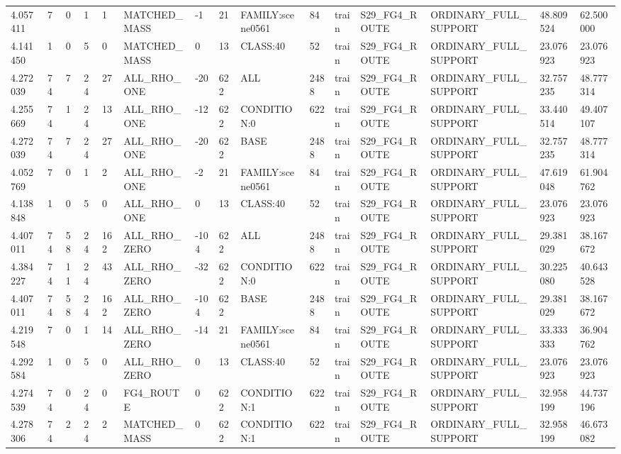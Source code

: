 \begin{tabular}{lllllllllllllll}
4.057411 & 7 & 0 & 1 & 1 & MATCHED\_MASS & -1 & 21 & FAMILY:scene0561 & 84 & train & S29\_FG4\_ROUTE & ORDINARY\_FULL\_SUPPORT & 48.809524 & 62.500000 \\
4.141450 & 1 & 0 & 5 & 0 & MATCHED\_MASS & 0 & 13 & CLASS:40 & 52 & train & S29\_FG4\_ROUTE & ORDINARY\_FULL\_SUPPORT & 23.076923 & 23.076923 \\
4.272039 & 74 & 7 & 24 & 27 & ALL\_RHO\_ONE & -20 & 622 & ALL & 2488 & train & S29\_FG4\_ROUTE & ORDINARY\_FULL\_SUPPORT & 32.757235 & 48.777314 \\
4.255669 & 74 & 1 & 24 & 13 & ALL\_RHO\_ONE & -12 & 622 & CONDITION:0 & 622 & train & S29\_FG4\_ROUTE & ORDINARY\_FULL\_SUPPORT & 33.440514 & 49.407107 \\
4.272039 & 74 & 7 & 24 & 27 & ALL\_RHO\_ONE & -20 & 622 & BASE & 2488 & train & S29\_FG4\_ROUTE & ORDINARY\_FULL\_SUPPORT & 32.757235 & 48.777314 \\
4.052769 & 7 & 0 & 1 & 2 & ALL\_RHO\_ONE & -2 & 21 & FAMILY:scene0561 & 84 & train & S29\_FG4\_ROUTE & ORDINARY\_FULL\_SUPPORT & 47.619048 & 61.904762 \\
4.138848 & 1 & 0 & 5 & 0 & ALL\_RHO\_ONE & 0 & 13 & CLASS:40 & 52 & train & S29\_FG4\_ROUTE & ORDINARY\_FULL\_SUPPORT & 23.076923 & 23.076923 \\
4.407011 & 74 & 58 & 24 & 162 & ALL\_RHO\_ZERO & -104 & 622 & ALL & 2488 & train & S29\_FG4\_ROUTE & ORDINARY\_FULL\_SUPPORT & 29.381029 & 38.167672 \\
4.384227 & 74 & 11 & 24 & 43 & ALL\_RHO\_ZERO & -32 & 622 & CONDITION:0 & 622 & train & S29\_FG4\_ROUTE & ORDINARY\_FULL\_SUPPORT & 30.225080 & 40.643528 \\
4.407011 & 74 & 58 & 24 & 162 & ALL\_RHO\_ZERO & -104 & 622 & BASE & 2488 & train & S29\_FG4\_ROUTE & ORDINARY\_FULL\_SUPPORT & 29.381029 & 38.167672 \\
4.219548 & 7 & 0 & 1 & 14 & ALL\_RHO\_ZERO & -14 & 21 & FAMILY:scene0561 & 84 & train & S29\_FG4\_ROUTE & ORDINARY\_FULL\_SUPPORT & 33.333333 & 36.904762 \\
4.292584 & 1 & 0 & 5 & 0 & ALL\_RHO\_ZERO & 0 & 13 & CLASS:40 & 52 & train & S29\_FG4\_ROUTE & ORDINARY\_FULL\_SUPPORT & 23.076923 & 23.076923 \\
4.274539 & 74 & 0 & 24 & 0 & FG4\_ROUTE & 0 & 622 & CONDITION:1 & 622 & train & S29\_FG4\_ROUTE & ORDINARY\_FULL\_SUPPORT & 32.958199 & 44.737196 \\
4.278306 & 74 & 2 & 24 & 2 & MATCHED\_MASS & 0 & 622 & CONDITION:1 & 622 & train & S29\_FG4\_ROUTE & ORDINARY\_FULL\_SUPPORT & 32.958199 & 46.673082 \\

\end{tabular}
